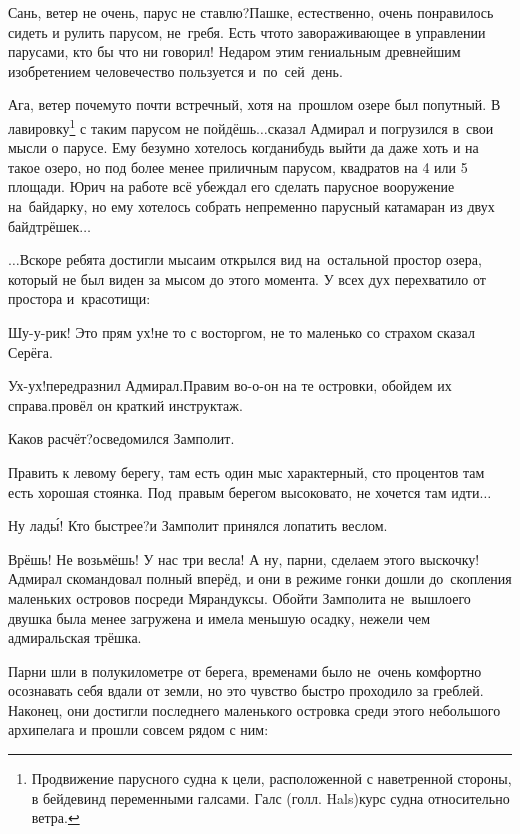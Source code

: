 \diagdash Сань, ветер не очень, парус не ставлю?\mdash Пашке, естественно, очень понравилось сидеть и рулить парусом, не~гребя. Есть что\sdash то завораживающее в управлении парусами, кто бы что ни говорил! Недаром этим гениальным древнейшим изобретением человечество пользуется и~по~сей~день.

\renewcommand*{\thefootnote}{\fnsymbol{footnote}}
\setcounter{footnote}{0}
\diagdash Ага, ветер почему\sdash то почти встречный, хотя на~прошлом озере был попутный. В лавировку\footnote{Продвижение парусного судна к цели, расположенной с наветренной стороны, в бейдевинд переменными галсами. Галс (голл. Hals)\mdash курс судна относительно ветра.} с таким парусом не пойдёшь$\ldots$\mdash сказал Адмирал и погрузился в~свои мысли о парусе. Ему безумно хотелось когда\sdash нибудь выйти да даже хоть и на такое озеро, но под более менее приличным парусом, квадратов на 4 или 5 площади. Юрич на работе всё убеждал его сделать парусное вооружение на~байдарку, но ему хотелось собрать непременно парусный катамаран из двух байд\sdash трёшек$\ldots$

\vspace{0.5cm}
$\ldots$Вскоре ребята достигли мыса\mdash им открылся вид на~остальной простор озера, который не был виден за мысом до этого момента. У всех дух перехватило от простора и~красотищи:

\diagdash Шу-у-рик! Это прям ух!\mdash не то с восторгом, не то маленько со страхом сказал Серёга.

\diagdash Ух-ух!\mdash передразнил Адмирал.\mdash Правим во-о-он на те островки, обойдем их справа.\mdash провёл он краткий инструктаж.

\diagdash Каков расчёт?\mdash осведомился Замполит.

\diagdash Править к левому берегу, там есть один мыс характерный, сто процентов там есть хорошая стоянка. Под~правым берегом высоковато, не хочется там идти$\ldots$

\diagdash Ну лад\'{ы}! Кто быстрее?\mdash и Замполит принялся лопатить веслом.

\diagdash Врёшь! Не возьмёшь! У нас три весла! А ну, парни, сделаем этого выскочку!\mdash Адмирал скомандовал полный вперёд, и они в режиме гонки дошли до~скопления маленьких островов посреди Мярандуксы. Обойти Замполита не~вышло\mdash его двушка была менее загружена и имела меньшую осадку, нежели чем адмиральская трёшка. 

Парни шли в полукилометре от берега, временами было не~очень комфортно осознавать себя вдали от земли, но это чувство быстро проходило за греблей. Наконец, они достигли последнего маленького островка среди этого небольшого архипелага и прошли совсем рядом с ним:

